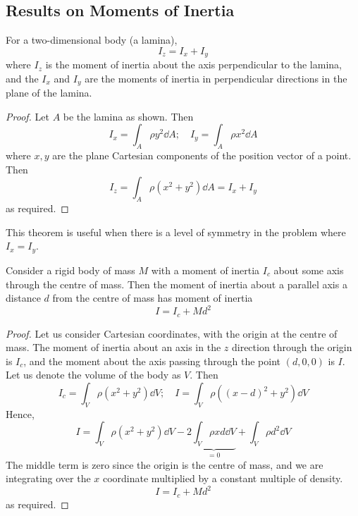 \subsection{Results on Moments of Inertia}
\begin{theorem}
	For a two-dimensional body (a lamina),
	\[ I_z = I_x + I_y \]
	where \(I_z\) is the moment of inertia about the axis perpendicular to the lamina, and the \(I_x\) and \(I_y\) are the moments of inertia in perpendicular directions in the plane of the lamina.
\end{theorem}
\begin{proof}
	Let \(A\) be the lamina as shown. Then
	\[ I_x = \int_A \rho y^2 \dd{A};\quad I_y = \int_A \rho x^2 \dd{A} \]
	where \(x, y\) are the plane Cartesian components of the position vector of a point. Then
	\[ I_z = \int_A \rho (x^2 + y^2) \dd{A} = I_x + I_y \]
	as required.
\end{proof}
\noindent This theorem is useful when there is a level of symmetry in the problem where \(I_x = I_y\).
\begin{theorem}
	Consider a rigid body of mass \(M\) with a moment of inertia \(I_c\) about some axis through the centre of mass. Then the moment of inertia about a parallel axis a distance \(d\) from the centre of mass has moment of inertia
	\[ I = I_c + Md^2 \]
\end{theorem}
\begin{proof}
	Let us consider Cartesian coordinates, with the origin at the centre of mass. The moment of inertia about an axis in the \(z\) direction through the origin is \(I_c\), and the moment about the axis passing through the point \((d, 0, 0)\) is \(I\). Let us denote the volume of the body as \(V\). Then
	\[ I_c = \int_V \rho (x^2 + y^2) \dd{V};\quad I = \int_V \rho ((x-d)^2 + y^2) \dd{V} \]
	Hence,
	\[ I = \int_V \rho (x^2 + y^2) \dd{V} - 2\underbrace{\int_V \rho xd \dd{V}}_{=0} + \int_V \rho d^2 \dd{V} \]
	The middle term is zero since the origin is the centre of mass, and we are integrating over the \(x\) coordinate multiplied by a constant multiple of density.
	\[ I = I_c + Md^2 \]
	as required.
\end{proof}

